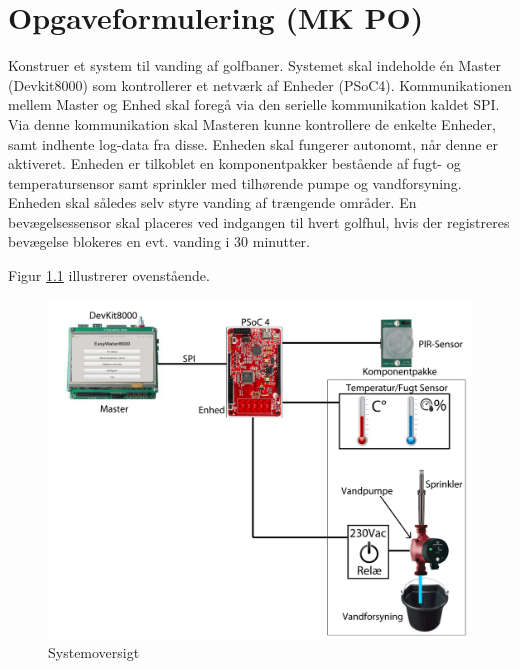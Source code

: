 \chapter{Opgaveformulering (MK PO)}

Konstruer et system til vanding af golfbaner. Systemet skal indeholde én Master (Devkit8000) som kontrollerer et netværk af Enheder (PSoC4). Kommunikationen mellem Master og Enhed skal foregå via den serielle kommunikation kaldet SPI. Via denne kommunikation skal Masteren kunne kontrollere de enkelte Enheder, samt indhente log-data fra disse. 
Enheden skal fungerer autonomt, når denne er aktiveret. Enheden  er tilkoblet en komponentpakker bestående af fugt- og temperatursensor samt sprinkler med tilhørende pumpe og vandforsyning. Enheden skal således selv styre vanding af trængende områder. En bevægelsessensor skal placeres ved indgangen til hvert golfhul, hvis der registreres bevægelse blokeres en evt. vanding i 30 minutter.  

Figur \ref{fig:systemoversigt} illustrerer ovenstående.  

\begin{figure}[h]
  \centering
    \includegraphics[width=\textwidth]{Billeder/systemoversigt}
    \caption{Systemoversigt}
    \label{fig:systemoversigt}
\end{figure}
